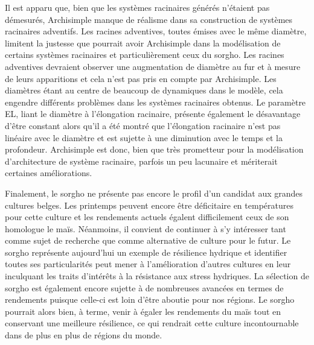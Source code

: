 Il est apparu que, bien que les systèmes racinaires générés n'étaient pas démesurés, Archisimple manque de réalisme dans sa construction de systèmes racinaires adventifs.
Les racines adventives, toutes émises avec le même diamètre, limitent la justesse que pourrait avoir Archisimple dans la modélisation de certains systèmes racinaires et particulièrement ceux du sorgho.
Les racines adventives devraient observer une augmentation de diamètre au fur et à mesure de leurs apparitions et cela n'est pas pris en compte par Archisimple.
Les diamètres étant au centre de beaucoup de dynamiques dans le modèle, cela engendre différents problèmes dans les systèmes racinaires obtenus.
Le paramètre EL, liant le diamètre à l'élongation racinaire, présente également le désavantage d'être constant alors qu'il a été montré que l'élongation racinaire n'est pas linéaire avec le diamètre et est sujette à une diminution avec le temps et la profondeur.
Archisimple est donc, bien que très prometteur pour la modélisation d'architecture de système racinaire, parfois un peu lacunaire et mériterait certaines améliorations.
\newline

Finalement, le sorgho ne présente pas encore le profil d'un candidat aux grandes cultures belges.
Les printemps peuvent encore être déficitaire en températures pour cette culture et les rendements actuels égalent difficilement ceux de son homologue le maïs.
Néanmoins, il convient de continuer à s'y intéresser tant comme sujet de recherche que comme alternative de culture pour le futur.
Le sorgho représente aujourd'hui un exemple de résilience hydrique et identifier toutes ses particularités peut mener à l'amélioration d'autres cultures en leur inculquant les traits d'intérêts à la résistance aux stress hydriques.
La sélection de sorgho est également encore sujette à de nombreuses avancées en termes de rendements puisque celle-ci est loin d'être aboutie pour nos régions.
Le sorgho pourrait alors bien, à terme, venir à égaler les rendements du maïs tout en conservant une meilleure résilience, ce qui rendrait cette culture incontournable dans de plus en plus de régions du monde.